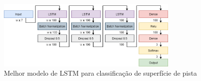 
\begin{figure}[h]
  \centering
  \caption{Melhor modelo de LSTM para classificação de superfície de pista}
  \label{fig:best_lstm_tipo_superficie_1}
  \includegraphics[width=0.8\textwidth]{figuras/fig_31.png}
\end{figure}

